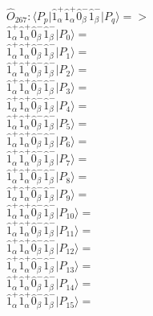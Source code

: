 \documentclass[14pt]{article}
\begin{document}
    $\hat{O}_{267}:  \langle{P_p}\vert \hat{1}_{\alpha}^{+}\hat{1}_{\alpha}^{+}\hat{0}_{\beta}^{-}\hat{1}_{\beta}^{-} \vert{P_q}\rangle => $ \\ 
    $ \hat{1}_{\alpha}^{+}\hat{1}_{\alpha}^{+}\hat{0}_{\beta}^{-}\hat{1}_{\beta}^{-} \vert{P_{0}}\rangle =  $ \\ 
    $ \hat{1}_{\alpha}^{+}\hat{1}_{\alpha}^{+}\hat{0}_{\beta}^{-}\hat{1}_{\beta}^{-} \vert{P_{1}}\rangle =  $ \\ 
    $ \hat{1}_{\alpha}^{+}\hat{1}_{\alpha}^{+}\hat{0}_{\beta}^{-}\hat{1}_{\beta}^{-} \vert{P_{2}}\rangle =  $ \\ 
    $ \hat{1}_{\alpha}^{+}\hat{1}_{\alpha}^{+}\hat{0}_{\beta}^{-}\hat{1}_{\beta}^{-} \vert{P_{3}}\rangle =  $ \\ 
    $ \hat{1}_{\alpha}^{+}\hat{1}_{\alpha}^{+}\hat{0}_{\beta}^{-}\hat{1}_{\beta}^{-} \vert{P_{4}}\rangle =  $ \\ 
    $ \hat{1}_{\alpha}^{+}\hat{1}_{\alpha}^{+}\hat{0}_{\beta}^{-}\hat{1}_{\beta}^{-} \vert{P_{5}}\rangle =  $ \\ 
    $ \hat{1}_{\alpha}^{+}\hat{1}_{\alpha}^{+}\hat{0}_{\beta}^{-}\hat{1}_{\beta}^{-} \vert{P_{6}}\rangle =  $ \\ 
    $ \hat{1}_{\alpha}^{+}\hat{1}_{\alpha}^{+}\hat{0}_{\beta}^{-}\hat{1}_{\beta}^{-} \vert{P_{7}}\rangle =  $ \\ 
    $ \hat{1}_{\alpha}^{+}\hat{1}_{\alpha}^{+}\hat{0}_{\beta}^{-}\hat{1}_{\beta}^{-} \vert{P_{8}}\rangle =  $ \\ 
    $ \hat{1}_{\alpha}^{+}\hat{1}_{\alpha}^{+}\hat{0}_{\beta}^{-}\hat{1}_{\beta}^{-} \vert{P_{9}}\rangle =  $ \\ 
    $ \hat{1}_{\alpha}^{+}\hat{1}_{\alpha}^{+}\hat{0}_{\beta}^{-}\hat{1}_{\beta}^{-} \vert{P_{10}}\rangle =  $ \\ 
    $ \hat{1}_{\alpha}^{+}\hat{1}_{\alpha}^{+}\hat{0}_{\beta}^{-}\hat{1}_{\beta}^{-} \vert{P_{11}}\rangle =  $ \\ 
    $ \hat{1}_{\alpha}^{+}\hat{1}_{\alpha}^{+}\hat{0}_{\beta}^{-}\hat{1}_{\beta}^{-} \vert{P_{12}}\rangle =  $ \\ 
    $ \hat{1}_{\alpha}^{+}\hat{1}_{\alpha}^{+}\hat{0}_{\beta}^{-}\hat{1}_{\beta}^{-} \vert{P_{13}}\rangle =  $ \\ 
    $ \hat{1}_{\alpha}^{+}\hat{1}_{\alpha}^{+}\hat{0}_{\beta}^{-}\hat{1}_{\beta}^{-} \vert{P_{14}}\rangle =  $ \\ 
    $ \hat{1}_{\alpha}^{+}\hat{1}_{\alpha}^{+}\hat{0}_{\beta}^{-}\hat{1}_{\beta}^{-} \vert{P_{15}}\rangle =  $ \\ 
    
\end{document}
